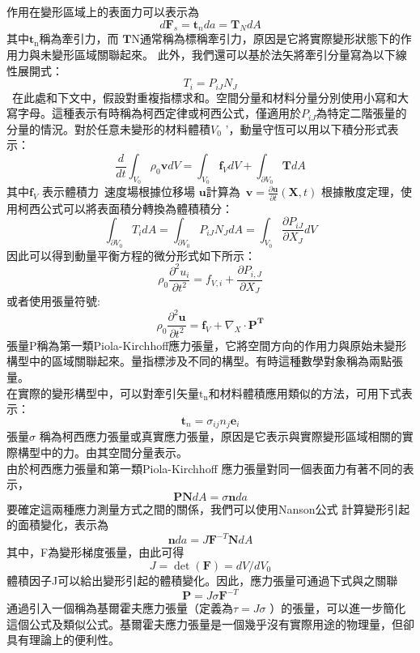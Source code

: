 作用在變形區域上的表面力可以表示為\
$$d \mathbf{F}_s=\mathbf{t}_n d a=\mathbf{T}_N d A$$
其中$\mathbf{t}_{\mathrm{n}}$稱為牽引力，而 $\mathbf{T} \mathrm{N}$通常稱為標稱牽引力，原因是它將實際變形狀態下的作用力與未變形區域關聯起來。
此外，我們還可以基於法矢將牽引分量寫為以下線性展開式：\\
$$T_i=P_{i J} N_J$$\
在此處和下文中，假設對重複指標求和。空間分量和材料分量分別使用小寫和大寫字母。這種表示有時稱為柯西定律或柯西公式，僅適用於$P_{i J}$為特定二階張量的分量的情況。對於任意未變形的材料體積$V_0$ '，動量守恆可以用以下積分形式表示：\\
$$\frac{d}{d t} \int_{V_0} \rho_0 \mathbf{v} d V=\int_{V_0} \mathbf{f}_V d V+\int_{\partial V_0} \mathbf{T} d A$$
其中$\mathbf{f}_V$ 表示體積力\
速度場根據位移場 $\mathbf{u}$計算為\
$\mathbf{v}=\frac{\partial \mathbf{u}}{\partial t}(\mathbf{X}, t)$ 
根據散度定理，使用柯西公式可以將表面積分轉換為體積積分：\\
$$\int_{\partial V_0} T_i d A=\int_{\partial V_0} P_{i J} N_J d A=\int_{V_0} \frac{\partial P_{i J}}{\partial X_J} d V$$
因此可以得到動量平衡方程的微分形式如下所示：\\
$$\rho_0 \frac{\partial^2 u_i}{\partial t^2}=f_{V, i}+\frac{\partial P_{i, J}}{\partial X_J}$$
或者使用張量符號:\\
$$
\rho_0 \frac{\partial^2 \mathbf{u}}{\partial t^2}=\mathbf{f}_V+\nabla_X \cdot \mathbf{P}^{\mathbf{T}}
$$
張量P稱為第一類Piola-Kirchhoff應力張量，它將空間方向的作用力與原始未變形構型中的區域關聯起來。量指標涉及不同的構型。有時這種數學對象稱為兩點張量。\\
在實際的變形構型中，可以對牽引矢量$\mathrm{t}_{\mathrm{n}}$和材料體積應用類似的方法，可用下式表示：\\
$$\mathbf{t}_n=\sigma_{i j} n_j \mathbf{e}_i$$
張量$\sigma$ 稱為柯西應力張量或真實應力張量，原因是它表示與實際變形區域相關的實際構型中的力。由其空間分量表示。\\
由於柯西應力張量和第一類Piola-Kirchhoff 應力張量對同一個表面力有著不同的表示，\\
$$\mathbf{P N} d A=\sigma \mathbf{n} d a$$
要確定這兩種應力測量方式之間的關係，我們可以使用Nanson公式 計算變形引起的面積變化，表示為\
$$\mathbf{n} d a=J \mathbf{F}^{-T} \mathbf{N} d A$$
其中，F為變形梯度張量，由此可得\
$$J=\operatorname{det}(\mathbf{F})=d V / d V_0$$
體積因子J可以給出變形引起的體積變化。因此，應力張量可通過下式與之關聯\
$$\mathbf{P}=J \sigma \mathbf{F}^{-T}$$
通過引入一個稱為基爾霍夫應力張量（定義為$\tau=J \sigma$ ）的張量，可以進一步簡化這個公式及類似公式。基爾霍夫應力張量是一個幾乎沒有實際用途的物理量，但卻具有理論上的便利性。\\









